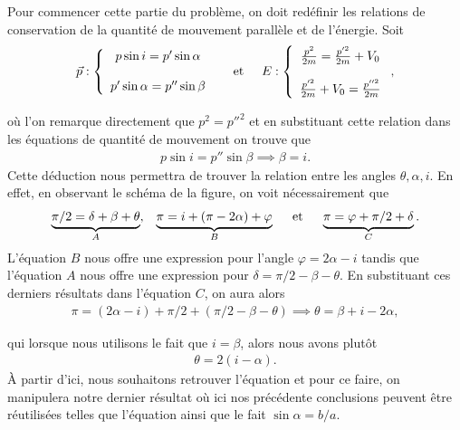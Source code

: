 \documentclass[../main.tex]{subfiles}
\begin{document}
    \noindent
    Pour commencer cette partie du problème, on doit redéfinir les relations de conservation de la quantité de mouvement parallèle et de l'énergie. Soit
    \begin{align*}
        \Vec{p}:
        \left\{
        \begin{array}{c}
            p\sin i = p'\sin\alpha \\\\
            p'\sin\alpha = p''\sin\beta
        \end{array}
        \right.
        \hspace{0.5cm}\text{et}\hspace{0.5cm}
        E:
        \left\{
        \begin{array}{c}
            \frac{p^2}{2m} = \frac{p'^2}{2m} + V_0 \\\\
            \frac{p'^2}{2m} + V_0 = \frac{p''^2}{2m}
        \end{array}
        \right.,
    \end{align*}

    où l'on remarque directement que $p^2 = p''^2$ et en substituant cette relation dans les équations de quantité de mouvement on trouve que
    \begin{align*}
        p\sin i = p''\sin\beta\implies\beta = i.
    \end{align*}
    Cette déduction nous permettra de trouver la relation entre les
    angles $\theta, \alpha, i$. En effet, en observant le schéma de
    la figure, on voit nécessairement que
    \begin{align*}
        \underbrace{\pi/2 = \delta + \beta + \theta}_A,\;\;\; \underbrace{\pi = i + (\pi - 2\alpha) + \varphi}_B\hspace{0.5cm}\text{et}\hspace{0.5cm} \underbrace{\pi = \varphi + \pi/2 + \delta}_C.
    \end{align*}
    L'équation $B$ nous offre une expression pour l'angle $\varphi = 2\alpha - i$ tandis que l'équation $A$ nous offre une expression pour $\delta = \pi/2 - \beta - \theta$. En substituant ces derniers résultats dans l'équation $C$, on aura alors
    \begin{align*}
        \pi = (2\alpha - i) + \pi/2 + (\pi/2 - \beta - \theta)\implies\theta = \beta + i - 2\alpha,
    \end{align*}

    qui lorsque nous utilisons le fait que $i = \beta$, alors nous avons
    plutôt
    \begin{align*}
        \theta = 2(i - \alpha).
    \end{align*}
    À partir d'ici, nous souhaitons retrouver l'équation et pour ce
    faire, on manipulera notre dernier résultat
    où ici nos précédente conclusions peuvent être réutilisées telles
    que l'équation ainsi que le fait
    $\sin\alpha = b/a$. \\

    \blindtext[2]

    \clearpage
\end{document}
